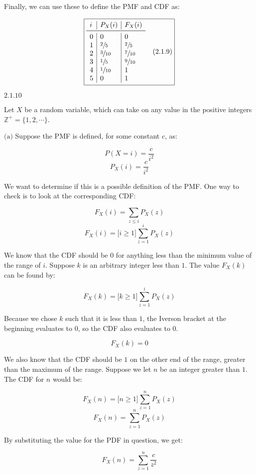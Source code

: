 \documentclass{article}
\newcommand{\problem}[2]{$\boxed{\text{#1.#2}}$}
\newcommand{\subproblem}[3]{$\boxed{\text{(#3)}}$}
\newcommand{\solution}[3]{\boxed{#3\quad(\text{#1.#2})}}
\begin{document}
Finally, we can use these to define the PMF and CDF as:

\[
\solution{2.1}{9}{\begin{array}{l|l|l}
i & P_X(i) & F_X(i) \\
\midrule
0 & 0 & 0 \\
1 & \sfrac{2}{5} & \sfrac{2}{5} \\
2 & \sfrac{3}{10} & \sfrac{7}{10} \\
3 & \sfrac{1}{5} & \sfrac{9}{10} \\
4 & \sfrac{1}{10} & 1 \\
5 & 0 & 1 \\
\end{array}}
\]

%
\problem{2.1}{10}

Let $X$ be a random variable, which can take on any value in the
positive integers $\mathbb{Z}^+=\{1,2,\cdots\}$.

%
\subproblem{2.1}{10}{a} Suppose the PMF is defined, for some constant
$c$, as:

\[
P(X=i)=\frac{c}{i^2}
\] \[
P_X(i)=\frac{c}{i^2}
\]

We want to determine if this is a possible definition of the PMF. One
way to check is to look at the corresponding CDF:

\[
F_X(i)=\sum\limits_{z\le{}i}P_X(z)
\] \[
F_X(i)=\lbrack i\ge1\rbrack\sum\limits_{z=1}^i P_X(z)
\]

We know that the CDF should be $0$ for anything less than the minimum
value of the range of $i$. Suppose $k$ is an arbitrary integer less
than $1$. The value $F_X(k)$ can be found by:

\[
F_X(k)=\lbrack k\ge 1\rbrack\sum\limits_{z=1}^i P_X(z)
\]

Because we chose $k$ such that it is less than $1$, the Iverson
bracket at the beginning evaluates to $0$, so the CDF also evaluates
to $0$.

\[
F_X(k)=0
\]

We also know that the CDF should be $1$ on the other end of the range,
greater than the maximum of the range. Suppose we let $n$ be an
integer greater than $1$. The CDF for $n$ would be:

\[
F_X(n)=\lbrack n\ge 1\rbrack\sum\limits_{z=1}^n P_X(z)
\] \[
F_X(n)=\sum\limits_{z=1}^n P_X(z)
\]

By substituting the value for the PDF in question, we get:

\[
F_X(n)=\sum\limits_{z=1}^n\frac{c}{z^2}
\]
\end{document}

